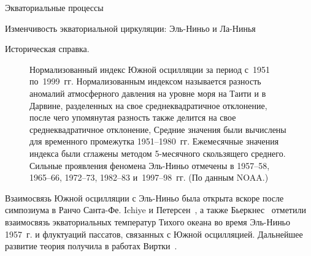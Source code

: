 \begin{chapter}{Экваториальные процессы}
\begin{section}{Изменчивость экваториальной циркуляции: Эль-Ниньо и Ла-Нинья}
\begin{paragraph}{Историческая справка.}
\begin{figure}[t!]
\caption{Нормализованный индекс Южной осцилляции за период с~1951
по~1999~гг. Нормализованным индексом называется разность аномалий атмосферного
давления на уровне моря на Таити и в Дарвине, разделенных на свое 
среднеквадратичное отклонение, после чего упомянутая разность также делится
на свое среднеквадратичное отклонение, 
Средние значения были вычислены для временного промежутка 1951--1980~гг. 
Ежемесячные значения индекса были сглажены методом 5-месячного скользящего 
среднего. Сильные проявления феномена Эль-Ниньо отмечены в 1957--58, 1965--66, 
1972--73, 1982--83 и~1997--98~гг. (По данным NOAA.)}
\label{fig:soi}
\end{figure}
%

Взаимосвязь Южной осцилляции с Эль-Ниньо
была открыта вскоре после симпозиума в Ранчо Санта-Фе. 
Ichiye и Петерсен~\cite{Ichiye:1963}, 
а также Бьеркнес~\cite{Bjerknes:1966} отметили взаимосвязь экваториальных
температур Тихого океана во время Эль-Ниньо 1957~г. и флуктуаций пассатов,
связанных с Южной осцилляцией. Дальнейшее развитие теория получила в работах
Виртки~\cite{Wyrtki:1975}.
%


\end{paragraph}
\end{section}
\end{chapter}
